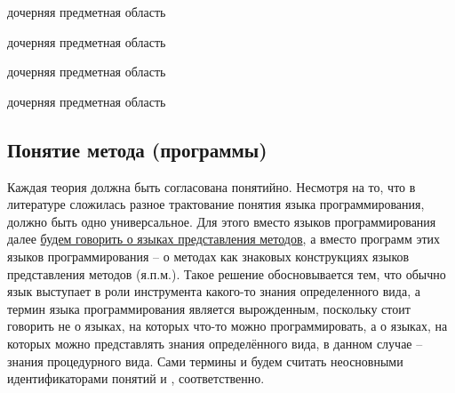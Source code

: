 \begin{SCn}
\begin{scnrelfromlist}{дочерняя предметная область}
    \begin{scnindent}
        \begin{scnrelfromlist}{дочерняя предметная область}
        \end{scnrelfromlist}
    \end{scnindent}
\end{scnrelfromlist}
\end{SCn}

\begin{SCn}
\begin{scnrelfromlist}{дочерняя предметная область}
    \begin{scnindent}
        \begin{scnrelfromlist}{дочерняя предметная область}
        \end{scnrelfromlist}
    \end{scnindent}
\end{scnrelfromlist}
\end{SCn}

\subsection{Понятие метода (программы)}
\label{sec_programs_method_concept}

Каждая теория должна быть согласована понятийно. Несмотря на то, что в литературе сложилась разное трактование понятия языка программирования, должно быть одно универсальное. Для этого вместо языков программирования далее \underline{будем говорить о языках представления методов}, а вместо программ этих языков программирования -- о методах как знаковых конструкциях языков представления методов (я.п.м.). Такое решение обосновывается тем, что обычно язык выступает в роли инструмента какого-то знания определенного вида, а термин языка программирования является вырожденным, поскольку стоит говорить не о языках, на которых что-то можно программировать, а о языках, на которых можно представлять знания определённого вида, в данном случае -- знания процедурного вида. Сами термины  и  будем считать неосновными идентификаторами понятий  и , соответственно.

